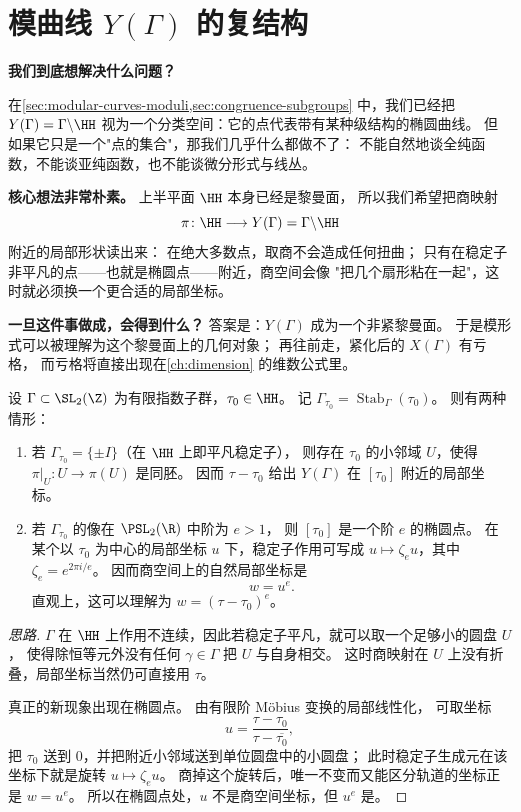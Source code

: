 \section{模曲线 $Y(\Gamma)$ 的复结构}
\label{sec:modular-curve-complex-structure}
\label{sec:y-gamma-complex-structure}

\textbf{我们到底想解决什么问题？}

在\cref{sec:modular-curves-moduli,sec:congruence-subgroups} 中，我们已经把
$Y(\Gamma)=\Gamma\backslash\HH$ 视为一个分类空间：它的点代表带有某种级结构的椭圆曲线。
但如果它只是一个"点的集合"，那我们几乎什么都做不了：
不能自然地谈全纯函数，不能谈亚纯函数，也不能谈微分形式与线丛。

\textbf{核心想法非常朴素。}
上半平面 $\HH$ 本身已经是黎曼面，
所以我们希望把商映射
\[
  \pi\colon \HH \longrightarrow Y(\Gamma)=\Gamma\backslash\HH
\]
附近的局部形状读出来：
在绝大多数点，取商不会造成任何扭曲；
只有在稳定子非平凡的点——也就是椭圆点——附近，商空间会像
"把几个扇形粘在一起"，这时就必须换一个更合适的局部坐标。

\textbf{一旦这件事做成，会得到什么？}
答案是：$Y(\Gamma)$ 成为一个非紧黎曼面。
于是模形式可以被理解为这个黎曼面上的几何对象；
再往前走，紧化后的 $X(\Gamma)$ 有亏格，
而亏格将直接出现在\cref{ch:dimension} 的维数公式里。

\begin{proposition}[普通点与椭圆点的局部模型]
\label{prop:y-gamma-local-model}
设 $\Gamma\subset \SL_2(\Z)$ 为有限指数子群，$\tau_0\in\HH$。
记 $\Gamma_{\tau_0}=\operatorname{Stab}_\Gamma(\tau_0)$。
则有两种情形：
\begin{enumerate}
  \item 若 $\Gamma_{\tau_0}=\{\pm I\}$（在 $\HH$ 上即平凡稳定子），
    则存在 $\tau_0$ 的小邻域 $U$，使得 $\pi|_U\colon U\to \pi(U)$ 是同胚。
    因而 $\tau-\tau_0$ 给出 $Y(\Gamma)$ 在 $[\tau_0]$ 附近的局部坐标。
  \item 若 $\Gamma_{\tau_0}$ 的像在 $\PSL_2(\R)$ 中阶为 $e>1$，
    则 $[\tau_0]$ 是一个阶 $e$ 的椭圆点。
    在某个以 $\tau_0$ 为中心的局部坐标 $u$ 下，稳定子作用可写成
    $u\mapsto \zeta_e u$，其中 $\zeta_e=e^{2\pi i/e}$。
    因而商空间上的自然局部坐标是
    \[
      w=u^e.
    \]
    直观上，这可以理解为 $w=(\tau-\tau_0)^e$。
\end{enumerate}
\end{proposition}

\begin{proof}[思路]
$\Gamma$ 在 $\HH$ 上作用不连续，因此若稳定子平凡，就可以取一个足够小的圆盘 $U$，
使得除恒等元外没有任何 $\gamma\in\Gamma$ 把 $U$ 与自身相交。
这时商映射在 $U$ 上没有折叠，局部坐标当然仍可直接用 $\tau$。

真正的新现象出现在椭圆点。
由有限阶 Möbius 变换的局部线性化，
可取坐标
\[
  u=\frac{\tau-\tau_0}{\tau-\overline{\tau_0}},
\]
把 $\tau_0$ 送到 $0$，并把附近小邻域送到单位圆盘中的小圆盘；
此时稳定子生成元在该坐标下就是旋转 $u\mapsto \zeta_e u$。
商掉这个旋转后，唯一不变而又能区分轨道的坐标正是 $w=u^e$。
所以在椭圆点处，$u$ 不是商空间坐标，但 $u^e$ 是。
\end{proof}

